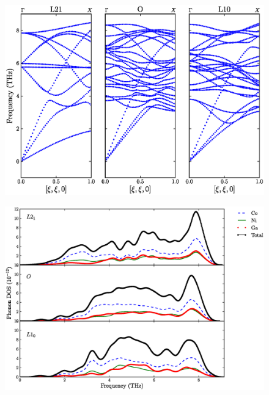\documentclass{article}
\begin{document}
\begin{figure}[htp!]%
\centerline{       \includegraphics[scale=0.8]{CNG_phonon_dispersion}}
     \end{figure}
\begin{figure}[htp!]%
\centerline{       \includegraphics[scale=0.6]{CNG_pvdos_all}}
     \end{figure}
\end{document}
